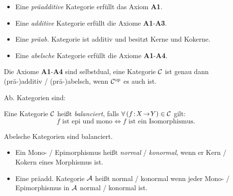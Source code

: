 \documentclass{cheat-sheet}
\begin{document}
\begin{defn}
  \begin{itemize}
    \item Eine \emph{präadditive} Kategorie erfüllt das Axiom \textbf{A1}. \\
    \item Eine \emph{additive} Kategorie erfüllt die Axiome \textbf{A1}-\textbf{A3}. \\
    \item Eine \emph{präab.} Kategorie ist additiv und besitzt Kerne und Kokerne.
    \item Eine \emph{abelsche} Kategorie erfüllt die Axiome \textbf{A1}-\textbf{A4}.
  \end{itemize}
\end{defn}

\begin{bem}
  Die Axiome \textbf{A1}-\textbf{A4} sind selbstdual, \dh{} eine Kategorie $\mathcal{C}$ ist genau dann (prä-)additiv / (prä-)abelsch, wenn $\mathcal{C}^{\mathrm{op}}$ es auch ist.
\end{bem}

\begin{bspe}
  Ab. Kategorien sind: \enspace
  \inlineitem{$\AbGrp$,} \enspace
   \enspace
\end{bspe}

\begin{defn}
  Eine Kategorie $\mathcal{C}$ heißt \emph{balanciert}, falls $\forall \, (f \!:\! X \!\to\! Y) \in \mathcal{C}$ gilt:
  \[ f \text{ ist epi und mono} \iff f \text{ ist ein Isomorphismus.} \]
\end{defn}

\begin{prop}
  Abelsche Kategorien sind balanciert.
\end{prop}

\begin{defn}
  \begin{itemize}
    \item Ein Mono- / Epimorphismus heißt \emph{normal} / \emph{konormal}, wenn er Kern / Kokern eines Morphismus ist.
    \item Eine präadd. Kategorie $\mathcal{A}$ heißt normal / konormal wenn jeder Mono- / Epimorphismus in $\mathcal{A}$ normal / konormal ist.
  \end{itemize}
\end{defn}
\end{document}
